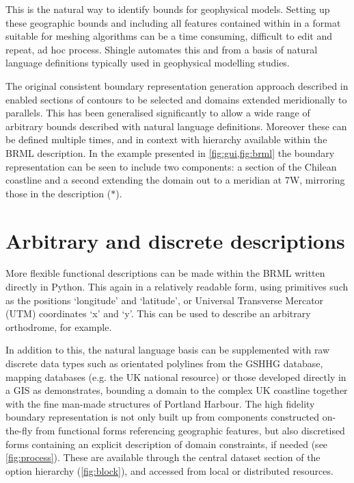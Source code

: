 \documentclass[a4paper, 10pt]{book}
\providecommand{\shingle}{Shingle\xspace}
\providecommand{\brml}{BRML\xspace}
\providecommand{\brep}{boundary representation\xspace}
\providecommand{\refdescriptionquotelink}{(\protect\hyperlink{description}{$\ast$})\xspace}
\begin{document}
This is the natural way to identify bounds for geophysical models.
%
Setting up these geographic bounds and including all features contained within in a format suitable for meshing algorithms can be a time consuming, difficult to edit and repeat, ad hoc process.
%
\shingle automates this and from a basis of natural language definitions typically used in geophysical modelling studies.


The original consistent boundary representation generation approach described in \cite{candybrep} enabled sections of contours to be selected and domains extended meridionally to parallels.
%
This has been generalised significantly to allow a wide range of arbitrary bounds described with natural language definitions.
%
Moreover these can be defined multiple times, and in context with hierarchy available within the \brml description.
%
In the example presented in \cref{fig:gui,fig:brml}
the \brep can be seen to include two components:
a section of the Chilean coastline
and a second extending the domain out to a meridian at 7\degree W,
mirroring those in the description 
\refdescriptionquotelink.

\section{Arbitrary and discrete descriptions}
More flexible functional descriptions can be made within the \brml written directly in Python.
This again in a relatively readable form, using primitives such as the positions `longitude' and `latitude',
or
Universal Transverse Mercator (UTM) coordinates `x' and `y'.
This can be used to describe an arbitrary orthodrome, for example.


In addition to this, the natural language basis can be supplemented with raw discrete data types such as orientated polylines from 
the
%
GSHHG
database,
mapping databases
(e.g. the UK national \cite{os} resource)
or those developed directly in a GIS
as \cite{candygis} demonstrates,
bounding a domain to the complex UK coastline together with the fine man-made structures of Portland Harbour.
%
The high fidelity \brep is not only built up from components constructed on-the-fly
from
functional forms referencing geographic features,
but also
discretised forms containing an explicit description of
domain constraints, if needed (see \cref{fig:process}).
%
These are available through the central dataset section of the option hierarchy (\cref{fig:block}), and accessed from
local or distributed resources.
\end{document}
